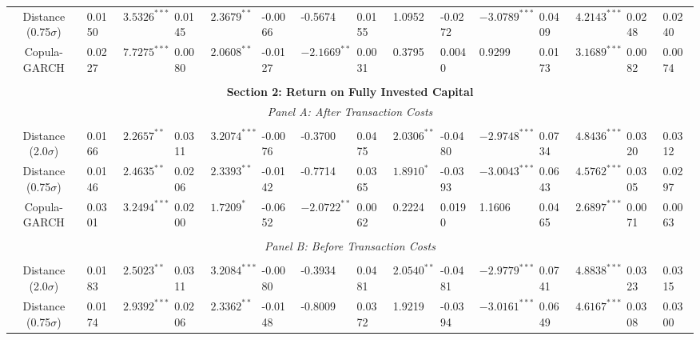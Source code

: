 \documentclass[a4paper]{article}
\begin{document}
\begin{sidewaystable}
\begin{threeparttable}[H]
\begin{tabularx}{\textwidth}{@{\extracolsep{\fill}}lllllllllllllll@{}}
				\multicolumn{1}{c}{Distance (0.75$\sigma$)} & 0.0150 & $3.5326^{***}$ & 0.0145 & $2.3679^{**}$ & -0.0066 & -0.5674 & 0.0155 & 1.0952 & -0.0272 & $-3.0789^{***}$ & 0.0409 & $4.2143^{***}$ & 0.0248 & 0.0240 \\
				\multicolumn{1}{c}{Copula-GARCH} & 0.0227 & $7.7275^{***}$ & 0.0080 & $2.0608^{**}$ & -0.0127 & $-2.1669^{**}$ & 0.0031 & 0.3795 & 0.0040 & 0.9299 & 0.0173 & $3.1689^{***}$ & 0.0082 & 0.0074  \\
				&       &       &       &       &       &       &       &       &       &       &       &       &       &  \\
				\midrule
				\multicolumn{15}{c}{\textbf{Section 2: Return on Fully Invested Capital}} \\
				\multicolumn{15}{c}{\textit{Panel A: After Transaction Costs}} \\
				&       &       &       &       &       &       &       &       &       &       &       &       &       &  \\
				\multicolumn{1}{c}{Distance (2.0$\sigma$)} & 0.0166 & $2.2657^{**}$ & 0.0311 & $3.2074^{***}$ & -0.0076 & -0.3700 & 0.0475 & $2.0306^{**}$ & -0.0480 & $-2.9748^{***}$ & 0.0734 & $4.8436^{***}$ & 0.0320 & 0.0312 \\
				\multicolumn{1}{c}{Distance (0.75$\sigma$)} & 0.0146 & $2.4635^{**}$ & 0.0206 & $2.3393^{**}$ & -0.0142 & -0.7714 & 0.0365 & $1.8910^{*}$ & -0.0393 & $-3.0043^{***}$ & 0.0643 & $4.5762^{***}$ & 0.0305 & 0.0297 \\
				\multicolumn{1}{c}{Copula-GARCH} & 0.0301 & $3.2494^{***}$ & 0.0200 & $1.7209^{*}$ & -0.0652 & $-2.0722^{**}$ & 0.0062 & 0.2224 & 0.0190 & 1.1606 & 0.0465 & $2.6897^{***}$ & 0.0071 & 0.0063 \\
				&       &       &       &       &       &       &       &       &       &       &       &       &       &  \\
				\multicolumn{15}{c}{\textit{Panel B: Before Transaction Costs}} \\
				&       &       &       &       &       &       &       &       &       &       &       &       &       &  \\
				\multicolumn{1}{c}{Distance (2.0$\sigma$)} & 0.0183 & $2.5023^{**}$ & 0.0311 & $3.2084^{***}$ & -0.0080 & -0.3934 & 0.0481 & $2.0540^{**}$ & -0.0481 & $-2.9779^{***}$ & 0.0741 & $4.8838^{***}$ & 0.0323 & 0.0315  \\
				\multicolumn{1}{c}{Distance (0.75$\sigma$)} & 0.0174 & $2.9392^{***}$ & 0.0206 & $2.3362^{**}$ & -0.0148 & -0.8009 & 0.0372 & 1.9219 & -0.0394 & $-3.0161^{***}$ & 0.0649 & $4.6167^{***}$ & 0.0308 & 0.0300 \\

\end{tabularx}
\end{threeparttable}
\end{sidewaystable}
\end{document}
